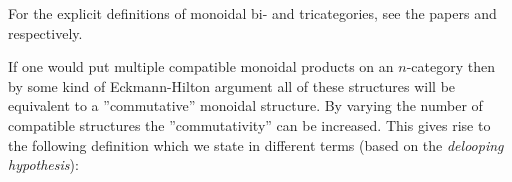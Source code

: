     For the explicit definitions of monoidal bi- and tricategories, see the papers \cite{monbicat} and \cite{montricat} respectively.

    If one would put multiple compatible monoidal products on an $n$-category then by some kind of Eckmann-Hilton argument all of these structures will be equivalent to a ''commutative'' monoidal structure. By varying the number of compatible structures the ''commutativity'' can be increased. This gives rise to the following definition which we state in different terms (based on the \textit{delooping hypothesis}):


